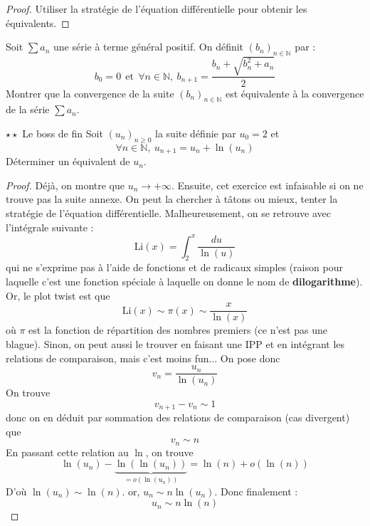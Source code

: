 \documentclass[french,a4paper]{article}
\newcommand{\N}{\mathbb{N}}
\theoremstyle{plain}
\theoremstyle{definition}
\theoremstyle{remark}
\begin{document}
\begin{proof}
	Utiliser la stratégie de l'équation différentielle pour obtenir les équivalents.
\end{proof}

\begin{ex}{}
	Soit $\displaystyle\sum a_n$ une série à terme général positif. On définit $(b_n)_{n\in\N}$ par : $$b_0=0\ \ \text{et}\ \ \forall n\in\N,\ b_{n+1}=\frac{b_n+\sqrt{b_n^2+a_n}}{2}$$ Montrer que la convergence de la suite $(b_n)_{n\in\N}$ est équivalente à la convergence de la série $\displaystyle\sum a_n$.
\end{ex}

\begin{ex}{$\star\star$ Le boss de fin}
	Soit $(u_n)_{n\geqslant0}$ la suite définie par $u_0=2$ et $$\forall n\in\N,\ u_{n+1}=u_n+\ln(u_n)$$ Déterminer un équivalent de $u_n$.
\end{ex}
\begin{proof}
	Déjà, on montre que $u_n\to+\infty$. Ensuite, cet exercice est infaisable si on ne trouve pas la suite annexe. On peut la chercher à tâtons ou mieux, tenter la stratégie de l'équation différentielle. Malheureusement, on se retrouve avec l'intégrale suivante : $$\text{Li}(x)=\int_{2}^{x}\frac{du}{\ln(u)}$$ qui ne s'exprime pas à l'aide de fonctions et de radicaux simples (raison pour laquelle c'est une fonction spéciale à laquelle on donne le nom de \textbf{dilogarithme}). Or, le plot twist est que $$\text{Li}(x)\sim\pi(x)\sim\frac{x}{\ln(x)}$$ où $\pi$ est la fonction de répartition des nombres premiers (ce n'est pas une blague). Sinon, on peut aussi le trouver en faisant une IPP et en intégrant les relations de comparaison, mais c'est moins fun... On pose donc $$v_n=\frac{u_n}{\ln(u_n)}$$ On trouve $$v_{n+1}-v_n\sim 1$$ donc on en déduit par sommation des relations de comparaison (cas divergent) que $$v_n\sim n$$ En passant cette relation au $\ln$, on trouve $$\ln(u_n)-\underbrace{\ln(\ln(u_n))}_{=o(\ln(u_n))}=\ln(n)+o(\ln(n))$$ D'où $\ln(u_n)\sim\ln(n)$. or, $u_n\sim n\ln(u_n)$. Donc finalement : $$u_n\sim n\ln(n)$$
\end{proof}
\end{document}
